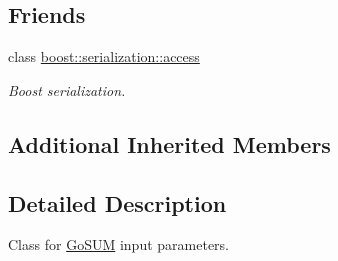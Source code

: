 \subsection*{Friends}
\begin{DoxyCompactItemize}
\item 
class \hyperlink{class_go_s_u_m_1_1_c_input_parameters_ac98d07dd8f7b70e16ccb9a01abf56b9c}{boost\-::serialization\-::access}
\begin{DoxyCompactList}\small\item\em Boost serialization. \end{DoxyCompactList}\end{DoxyCompactItemize}
\subsection*{Additional Inherited Members}


\subsection{Detailed Description}
Class for \hyperlink{struct_go_s_u_m}{Go\-S\-U\-M} input parameters. 


